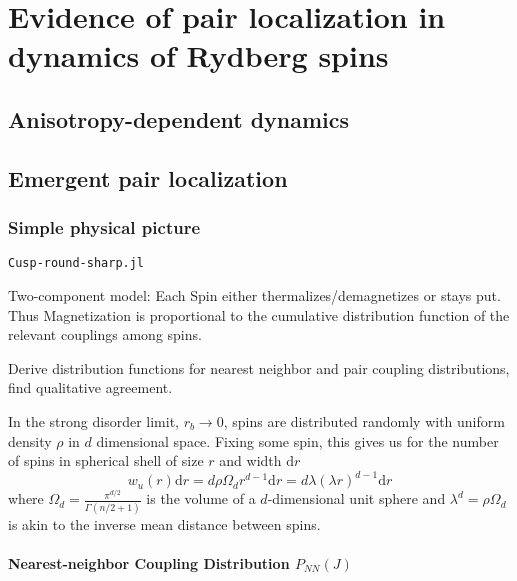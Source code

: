 \chapter{Evidence of pair localization in dynamics of Rydberg spins}
\section{Anisotropy-dependent dynamics}


\section{Emergent pair localization}





\subsection{Simple physical picture}
\texttt{Cusp-round-sharp.jl}

Two-component model: Each Spin either thermalizes/demagnetizes or stays put. Thus Magnetization is proportional to the cumulative distribution function of the relevant couplings among spins.

Derive distribution functions for nearest neighbor and pair coupling distributions, find qualitative agreement.

\cite{chavezUltraslowGrowthNumber2023}

In the strong disorder limit, \ie $r_b\rightarrow 0$, spins are distributed randomly with uniform density $\rho$ in $d$ dimensional space. Fixing some spin, this gives us for the number of spins in spherical shell of size $r$ and width $\mathrm{d}r$
\begin{equation}\label{eq:uniform-spin-distribution}
	w_u(r)\mathrm{d}r = d \rho \Omega_d r^{d-1}\mathrm{d}r = d\lambda (\lambda r)^{d-1}\mathrm{d}r
\end{equation}
where $\Omega_d = \frac{\pi^{d/2}}{\Gamma(n/2+1)}$ is the volume of a $d$-dimensional unit sphere and $\lambda^d = \rho \Omega_d$ is akin to the inverse mean distance between spins. 

\subsubsection{Nearest-neighbor Coupling Distribution $P_{NN}(J)$}

